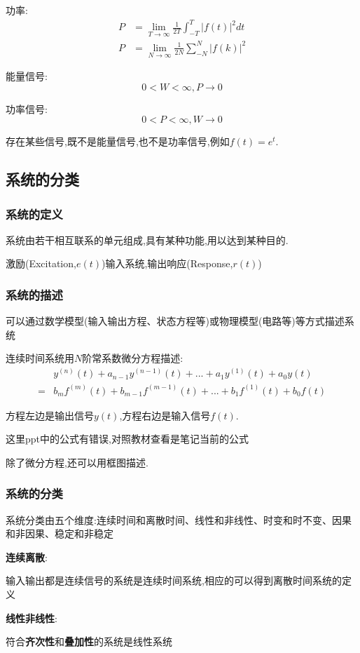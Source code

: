 \documentclass[12pt, a4paper, oneside]{ctexart}
\begin{document}
功率:
\begin{align*}
    P &= \lim_{T \to \infty}\frac{1}{2T}\int_{-T}^{T}|f(t)|^2 dt\\
    P &= \lim_{N \to \infty}\frac{1}{2N}\sum_{-N}^{N}|f(k)|^2
\end{align*}

能量信号:
\[
    0<W<\infty,P\to 0
\]

功率信号:
\[
    0<P<\infty,W\to 0
\]

存在某些信号,既不是能量信号,也不是功率信号,例如$f(t)=e^t$.
\subsection{系统的分类}
\subsubsection{系统的定义}
系统由若干相互联系的单元组成,具有某种功能,用以达到某种目的.

激励(Excitation,$e(t)$)输入系统,输出响应(Response,$r(t)$)

\subsubsection{系统的描述}
可以通过数学模型(输入输出方程、状态方程等)或物理模型(电路等)等方式描述系统

连续时间系统用$N$阶常系数微分方程描述:
\begin{align*}
    &y^{(n)}(t)+a_{n-1}y^{(n-1)}(t)+...+a_1y^{(1)}(t)+a_0y(t)\\
    = &b_mf^{(m)}(t)+b_{m-1}f^{(m-1)}(t)+...+b_1f^{(1)}(t)+b_0f(t)
\end{align*}

方程左边是输出信号$y(t)$,方程右边是输入信号$f(t)$.

这里ppt中的公式有错误,对照教材查看是笔记当前的公式

除了微分方程,还可以用框图描述.

\subsubsection{系统的分类}
系统分类由五个维度:连续时间和离散时间、线性和非线性、时变和时不变、因果和非因果、稳定和非稳定

\textbf{连续离散}:

输入输出都是连续信号的系统是连续时间系统,相应的可以得到离散时间系统的定义

\textbf{线性非线性}:

符合\textbf{齐次性}和\textbf{叠加性}的系统是线性系统
\end{document}
